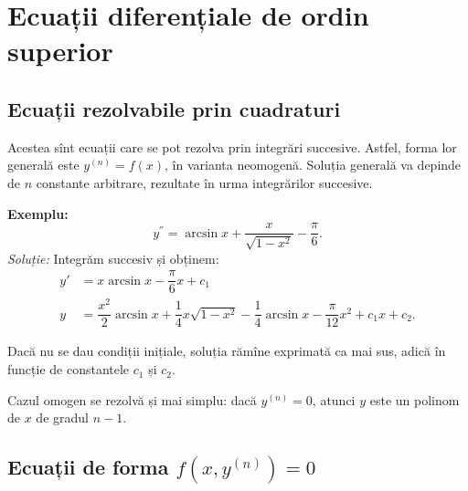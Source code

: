 
\chapter{Ecuații diferențiale de ordin superior}

\section{Ecuații rezolvabile prin cuadraturi}

\indent\indent Acestea sînt ecuații care se pot rezolva prin integrări
succesive. Astfel, forma lor generală este $ y^{(n)} = f(x) $, în varianta
neomogenă. Soluția generală va depinde de $ n $ constante arbitrare,
rezultate în urma integrărilor succesive.

\textbf{Exemplu:}
\[
  y^{''} = \arcsin x + \frac{x}{\sqrt{1 - x^2}} - \frac{\pi}{6}.
\]
\emph{Soluție:} Integrăm succesiv și obținem:
\begin{align*}
  y' &= x \arcsin x - \dfrac{\pi}{6} x + c_1 \\
  y &= \dfrac{x^2}{2} \arcsin x + \dfrac{1}{4}x \sqrt{1 - x^2} - %
  \dfrac{1}{4} \arcsin x - \dfrac{\pi}{12} x^2 + c_1 x + c_2.
\end{align*}

Dacă nu se dau condiții inițiale, soluția rămîne exprimată ca mai sus,
adică în funcție de constantele $ c_1 $ și $ c_2 $.

\vspace{1cm}

Cazul omogen se rezolvă și mai simplu: dacă $ y^{(n)} = 0 $, atunci
$ y $ este un polinom de $ x $ de gradul $ n - 1 $.


\section{Ecuații de forma $ f(x, y^{(n)}) = 0 $}

